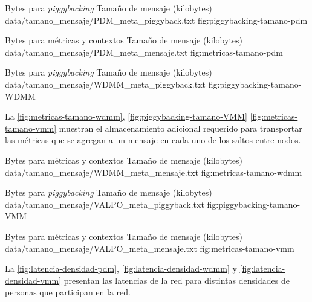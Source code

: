 {
\graficoProtocolo
{Bytes para \textit{piggybacking}}
{Tamaño de mensaje (kilobytes)}
{data/tamano_mensaje/PDM_meta_piggyback.txt}
}{fig:piggybacking-tamano-pdm}



{
\graficoProtocolo
{Bytes para métricas y contextos}
{Tamaño de mensaje (kilobytes)}
{data/tamano_mensaje/PDM_meta_mensaje.txt}
}{fig:metricas-tamano-pdm}


{
\graficoProtocolo
{Bytes para \textit{piggybacking}}
{Tamaño de mensaje (kilobytes)}
{data/tamano_mensaje/WDMM_meta_piggyback.txt}
}{fig:piggybacking-tamano-WDMM}


La \ref{fig:metricas-tamano-wdmm}, \ref{fig:piggybacking-tamano-VMM}
\ref{fig:metricas-tamano-vmm} muestran el almacenamiento adicional requerido
para transportar las métricas que se agregan a un mensaje en cada uno de los
saltos entre nodos.

{
\graficoProtocolo
{Bytes para métricas y contextos}
{Tamaño de mensaje (kilobytes)}
{data/tamano_mensaje/WDMM_meta_mensaje.txt}
}{fig:metricas-tamano-wdmm}


{
\graficoProtocolo
{Bytes para \textit{piggybacking}}
{Tamaño de mensaje (kilobytes)}
{data/tamano_mensaje/VALPO_meta_piggyback.txt}
}{fig:piggybacking-tamano-VMM}



{
\graficoProtocolo
{Bytes para métricas y contextos}
{Tamaño de mensaje (kilobytes)}
{data/tamano_mensaje/VALPO_meta_mensaje.txt}
}{fig:metricas-tamano-vmm}



\newcommand{\densidades}{distintas densidades de personas}


La \ref{fig:latencia-densidad-pdm},
\ref{fig:latencia-densidad-wdmm} y 
\ref{fig:latencia-densidad-vmm} presentan las latencias de la red para distintas
densidades de personas que participan en la red.



